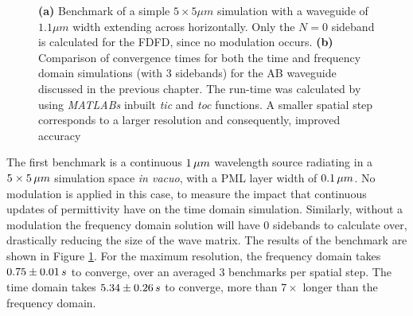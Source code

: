 \begin{figure}[t]
	\centering
	\setlength{\figH}{0.4\textwidth}
	\setlength{\figW}{0.4\textwidth}
	\begin{subfigure}[t]{0.5\textwidth}
		
		\caption{}
		\label{sfig:nomodbench}
	\end{subfigure}%
	\begin{subfigure}[t]{0.5\textwidth}
		
		\caption{}
		\label{sfig:benchabc}
	\end{subfigure}%
	\caption[Convergence time benchmarks for FDTD and FDFD]{\textbf{(a)} Benchmark of a simple $5 \times 5 \mu m$ simulation with a waveguide of $1.1 \mu m$ width extending across horizontally. Only the $N=0$ sideband is calculated for the FDFD, since no modulation occurs. \textbf{(b)} Comparison of convergence times for both the time and frequency domain simulations (with 3 sidebands) for the AB waveguide discussed in the previous chapter. The run-time was calculated by using \textit{MATLABs} inbuilt \textit{tic} and \textit{toc} functions. A smaller spatial step corresponds to a larger resolution and consequently, improved accuracy}
	\label{fig:benchmark}
\end{figure}

The first benchmark is a continuous $1  \mskip3mu \mu m$ wavelength source radiating in a $5 \times 5  \mskip3mu \mu m$ simulation space \textit{in vacuo}, with a PML layer width of $0.1  \mskip3mu \mu m$. No modulation is applied in this case, to measure the impact that continuous updates of permittivity have on the time domain simulation. Similarly, without a modulation the frequency domain solution will have $0$ sidebands to calculate over, drastically reducing the size of the wave matrix. The results of the benchmark are shown in Figure \ref{sfig:nomodbench}. For the maximum resolution, the frequency domain takes $0.75 \pm 0.01  \mskip3mu s$ to converge, over an averaged $3$ benchmarks per spatial step. The time domain takes $5.34 \pm 0.26  \mskip3mu s$ to converge, more than $7 \times $ longer than the frequency domain.

